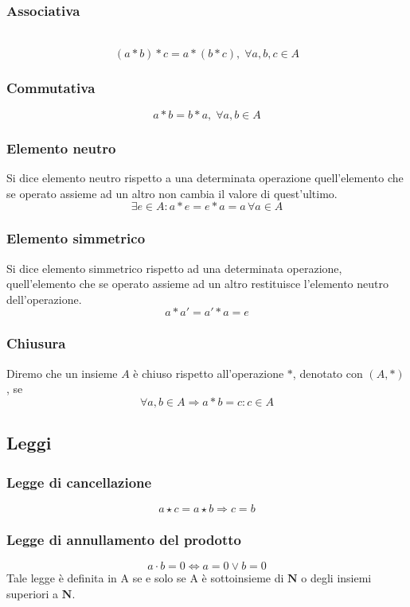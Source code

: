 \begin{flushleft}
\subsubsection{Associativa}\
\[(a\ast b) \ast c = a \ast (b\ast c),\;\forall a, b, c \in A\]
\subsubsection{Commutativa}
\[a\ast b = b \ast a,\;\forall a, b \in A\]
\subsubsection{Elemento neutro}
Si dice elemento neutro rispetto a una determinata operazione quell'elemento che se operato assieme ad un altro non cambia il valore di quest'ultimo.
\[\exists e \in A: a\ast e = e \ast a = a\, \forall a \in A\]
\subsubsection{Elemento simmetrico}
Si dice elemento simmetrico rispetto ad una determinata operazione, quell'elemento che se operato assieme ad un altro restituisce l'elemento neutro dell'operazione.
\[a\ast a' = a'\ast a = e\]

\subsubsection{Chiusura}
Diremo che un insieme $A$ è chiuso rispetto all'operazione $\ast$, denotato con $(A, \ast)$, se 
\[\forall a,b \in A \Rightarrow a\ast b = c: c\in A\]
\subsection{Leggi}
\subsubsection{Legge di cancellazione}
\[a\star c = a \star b \Rightarrow c = b\]
\subsubsection{Legge di annullamento del prodotto}
\[a\cdot b = 0\Leftrightarrow a=0 \lor b = 0\]
Tale legge è definita in A se e solo se A è sottoinsieme di $\mathbf{N}$ o degli insiemi superiori a $\mathbf{N}$.


\end{flushleft}
